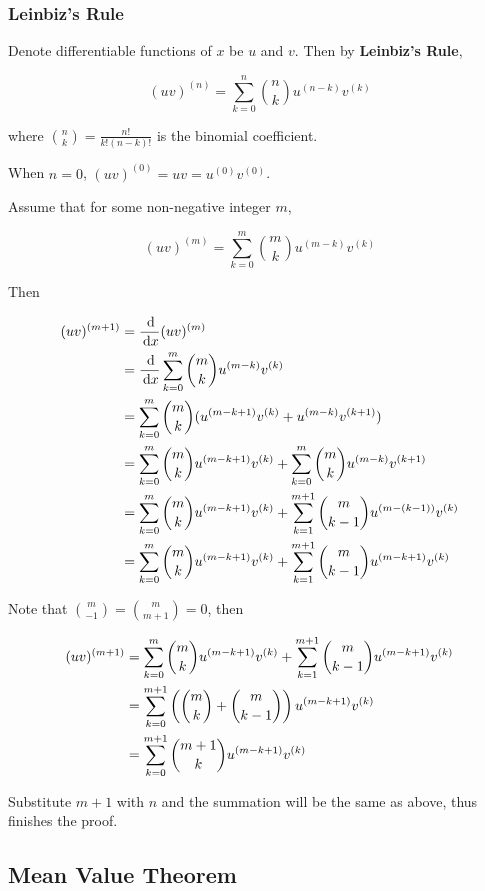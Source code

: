 \documentclass[a4paper,12pt]{article}
\begin{document}
\subsubsection{Leinbiz's Rule}
\begin{thm}
  Denote differentiable functions of $x$ be $u$ and $v$. Then by \textbf{Leinbiz's Rule},

  $$(uv)^{(n)}=\sum_{k=0}^{n}\binom{n}{k}u^{(n-k)}v^{(k)}$$\s

  where $\binom{n}{k}=\frac{n!}{k!(n-k)!}$ is the binomial coefficient.\n

  \prf When $n=0$, $(uv)^{(0)}=uv=u^{(0)}v^{(0)}$.\n

  Assume that for some non-negative integer $m$,

  $$(uv)^{(m)}=\sum_{k=0}^{m}\binom{m}{k}u^{(m-k)}v^{(k)}$$\s

  Then

  $$\begin{aligned}[t]
    (uv)^{(m+1)}&=\frac{\,\mathrm{d}}{\,\mathrm{d} x}(uv)^{(m)}\\
    &=\frac{\,\mathrm{d}}{\,\mathrm{d} x}\sum_{k=0}^{m}\binom{m}{k}u^{(m-k)}v^{(k)}\\
    &=\sum_{k=0}^{m}\binom{m}{k}(u^{(m-k+1)}v^{(k)}+u^{(m-k)}v^{(k+1)})\\
    &=\sum_{k=0}^{m}\binom{m}{k}u^{(m-k+1)}v^{(k)}+\sum_{k=0}^{m}\binom{m}{k}u^{(m-k)}v^{(k+1)}\\
    &=\sum_{k=0}^{m}\binom{m}{k}u^{(m-k+1)}v^{(k)}+\sum_{k=1}^{m+1}\binom{m}{k-1}u^{(m-(k-1))}v^{(k)}\\
    &=\sum_{k=0}^{m}\binom{m}{k}u^{(m-k+1)}v^{(k)}+\sum_{k=1}^{m+1}\binom{m}{k-1}u^{(m-k+1)}v^{(k)}
  \end{aligned}$$\s

  Note that $\binom{m}{-1}=\binom{m}{m+1}=0$, then

  $$\begin{aligned}[t]
    (uv)^{(m+1)}&=\sum_{k=0}^{m}\binom{m}{k}u^{(m-k+1)}v^{(k)}+\sum_{k=1}^{m+1}\binom{m}{k-1}u^{(m-k+1)}v^{(k)}\\
    &=\sum_{k=0}^{m+1}\left( \binom{m}{k}+\binom{m}{k-1}\right)u^{(m-k+1)}v^{(k)}\\
    &=\sum_{k=0}^{m+1}\binom{m+1}{k}u^{(m-k+1)}v^{(k)}
  \end{aligned}$$\s

  Substitute $m+1$ with $n$ and the summation will be the same as above, thus finishes the proof.
\end{thm}

\subsection{Mean Value Theorem}
\end{document}
